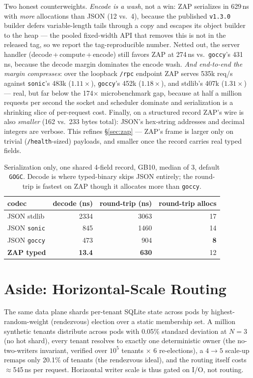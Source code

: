 \documentclass[11pt,twocolumn]{article}
\begin{document}
Two honest counterweights. \emph{Encode is a wash}, not a win: ZAP serializes in
629\,ns with \emph{more} allocations than JSON (12 vs.\ 4), because the published
\texttt{v1.3.0} builder defers variable-length tails through a copy and escapes
its object builder to the heap --- the pooled fixed-width API that removes this is
not in the released tag, so we report the tag-reproducible number. Netted out, the
server handler (decode\,+\,compute\,+\,encode) still favors ZAP at 274\,ns vs.\
\texttt{goccy}'s 431\,ns, because the decode margin dominates the encode wash.
\emph{And end-to-end the margin compresses}: over the loopback \texttt{/rpc}
endpoint ZAP serves 535k req/s against \texttt{sonic}'s 483k ($1.11\times$),
\texttt{goccy}'s 452k ($1.18\times$), and stdlib's 407k ($1.31\times$) --- real,
but far below the 174$\times$ microbenchmark gap, because at half a million
requests per second the socket and scheduler dominate and serialization is a
shrinking slice of per-request cost. Finally, on a structured record ZAP's wire is
also \emph{smaller} (162 vs.\ 233 bytes total): JSON's hex-string addresses and
decimal integers are verbose. This refines \S\ref{sec:zap} --- ZAP's frame is
larger only on trivial (\texttt{/health}-sized) payloads, and smaller once the
record carries real typed fields.

\begin{table}[t]
\centering
\caption{Serialization only, one shared 4-field record, GB10, median of 3,
default \texttt{GOGC}. Decode is where typed-binary skips JSON entirely; the
round-trip is fastest on ZAP though it allocates more than \texttt{goccy}.}
\label{tab:serde}
\begin{tabular}{lrrr}
\toprule
codec & decode (ns) & round-trip (ns) & round-trip allocs \\
\midrule
JSON stdlib          & 2334          & 3063         & 17 \\
JSON \texttt{sonic}  & 845           & 1460         & 14 \\
JSON \texttt{goccy}  & 473           & 904          & \textbf{8} \\
\textbf{ZAP typed}   & \textbf{13.4} & \textbf{630} & 12 \\
\bottomrule
\end{tabular}
\end{table}

\section{Aside: Horizontal-Scale Routing}
The same data plane shards per-tenant SQLite state across pods by
highest-random-weight (rendezvous) election over a static membership set. A
million synthetic tenants distribute across pods with 0.05\% standard deviation
at $N{=}3$ (no hot shard), every tenant resolves to exactly one deterministic
owner (the no-two-writers invariant, verified over $10^5$ tenants $\times$ 6
re-elections), a $4\to5$ scale-up remaps only 20.1\% of tenants (the rendezvous
ideal), and the routing itself costs $\approx$545\,ns per request. Horizontal
writer scale is thus gated on I/O, not routing.
\end{document}
